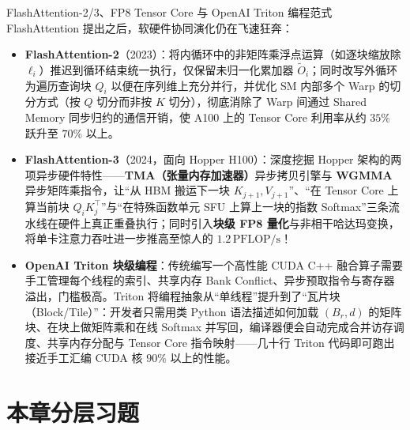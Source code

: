 \begin{extBox}{FlashAttention-2/3、FP8 Tensor Core 与 OpenAI Triton 编程范式}
FlashAttention 提出之后，软硬件协同演化仍在飞速狂奔：
\begin{itemize}
  \item \textbf{FlashAttention-2}（2023）：将内循环中的非矩阵乘浮点运算（如逐块缩放除 $\ell_i$）推迟到循环结束统一执行，仅保留未归一化累加器 $\tilde{O}_i$；同时改写外循环为遍历查询块 $Q_i$ 以便在序列维上充分并行，并优化 SM 内部多个 Warp 的切分方式（按 $Q$ 切分而非按 $K$ 切分），彻底消除了 Warp 间通过 Shared Memory 同步归约的通信开销，使 A100 上的 Tensor Core 利用率从约 $35\%$ 跃升至 $70\%$ 以上。
  \item \textbf{FlashAttention-3}（2024，面向 Hopper H100）：深度挖掘 Hopper 架构的两项异步硬件特性——\textbf{TMA（张量内存加速器）}异步拷贝引擎与 \textbf{WGMMA} 异步矩阵乘指令，让“从 HBM 搬运下一块 $K_{j+1}, V_{j+1}$”、“在 Tensor Core 上算当前块 $Q_i K_j^\top$”与“在特殊函数单元 SFU 上算上一块的指数 Softmax”三条流水线在硬件上真正重叠执行；同时引入\textbf{块级 FP8 量化}与非相干哈达玛变换，将单卡注意力吞吐进一步推高至惊人的 $1.2\,\mathrm{PFLOP/s}$！
  \item \textbf{OpenAI Triton 块级编程}：传统编写一个高性能 CUDA C++ 融合算子需要手工管理每个线程的索引、共享内存 Bank Conflict、异步预取指令与寄存器溢出，门槛极高。Triton 将编程抽象从“单线程”提升到了“瓦片块（Block/Tile）”：开发者只需用类 Python 语法描述如何加载 $(B_r, d)$ 的矩阵块、在块上做矩阵乘和在线 Softmax 并写回，编译器便会自动完成合并访存调度、共享内存分配与 Tensor Core 指令映射——几十行 Triton 代码即可跑出接近手工汇编 CUDA 核 $90\%$ 以上的性能。
\end{itemize}
\end{extBox}

\section*{本章分层习题}


